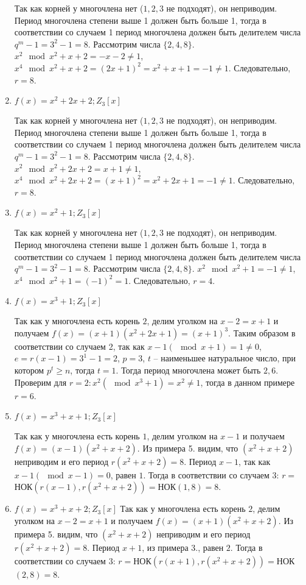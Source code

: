 \documentclass[12pt]{extarticle}
\begin{document}
\begin{enumerate}
    Так как корней у многочлена нет ($1,2,3$ не подходят), он неприводим. Период многочлена степени выше 1 должен быть больше 1, тогда в соответствии со случаем 1 период многочлена должен быть делителем числа $q^m -1 = 3^2 -1 = 8$. Рассмотрим числа $\{2, 4, 8\}$. $x^2 \mod x^2 + x +2 = - x - 2 \neq 1$,  $x^4 \mod x^2 + x +2 = (2x + 1)^2 = x^2 + x + 1 = - 1 \neq 1$. Следовательно, $r=8$.

    \item $f(x)=x^2+2x+2; Z_3[x]$
    
    Так как корней у многочлена нет ($1,2,3$ не подходят), он неприводим. Период многочлена степени выше 1 должен быть больше 1, тогда в соответствии со случаем 1 период многочлена должен быть делителем числа $q^m -1 = 3^2 -1 = 8$. Рассмотрим числа $\{2, 4, 8\}$. $x^2 \mod x^2 + 2x +2 = x +1 \neq 1$,  $x^4 \mod x^2 + 2x +2 = (x +1)^2 = x^2 + 2x + 1 = - 1 \neq 1$. Следовательно, $r=8$.

    \item $f(x)=x^2+1; Z_3[x]$
    
    Так как корней у многочлена нет ($1,2,3$ не подходят), он неприводим. Период многочлена степени выше 1 должен быть больше 1, тогда в соответствии со случаем 1 период многочлена должен быть делителем числа $q^m -1 = 3^2 -1 = 8$. Рассмотрим числа $\{2, 4, 8\}$. $x^2 \mod x^2 + 1 = -1 \neq 1$,  $x^4 \mod x^2 + 1 = (-1)^2 = 1$. Следовательно, $r=4$.

    \item $f(x)=x^3+1; Z_3[x]$
    
    Так как у многочлена есть корень $2$, делим уголком на $x-2 = x+1$ и получаем $f(x) = (x+1) (x^2 + 2x +1) = (x+1)^3$. Таким образом в соответствии со случаем 2, так как $x - 1 (\mod{x + 1}) = 1 \neq 0$, $e = r(x-1) = 3^1 - 1 = 2$, $p = 3$, $t$ – наименьшее натуральное число, при котором $p^t\geq n$, тогда $t = 1$. Тогда период многочлена может быть ${2, 6}$. Проверим для $r = 2: x^2 (\mod x^3 + 1) = x^2 \neq 1$, тогда в данном примере $r = 6$.

    \item $f(x)=x^3+x+1; Z_3[x]$
    
    Так как у многочлена есть корень $1$, делим уголком на $x-1$ и получаем $f(x) = (x-1) (x^2 + x +2)$. Из примера 5. видим, что $(x^2 + x +2)$ неприводим и его период $r(x^2 + x +2) = 8$. Период $x -1$, так как $x -1 (\mod{x - 1}) = 0$, равен $1$. Тогда в соответствии со случаем 3: $r =$НОК$(r(x-1), r(x^2 + x +2)) = $НОК$(1, 8) = 8$.
    

    \item $f(x)=x^3+x+2; Z_3[x]$
    Так как у многочлена есть корень $2$, делим уголком на $x-2 = x+1$ и получаем $f(x) = (x+1) (x^2 + x +2)$. Из примера 5. видим, что $(x^2 + x +2)$ неприводим и его период $r(x^2 + x +2) = 8$. Период $x + 1$, из примера 3., равен $2$. Тогда в соответствии со случаем 3: $r =$НОК$(r(x+1), r(x^2 + x +2)) = $НОК$(2, 8) = 8$.
    
\end{enumerate}
\end{document}
